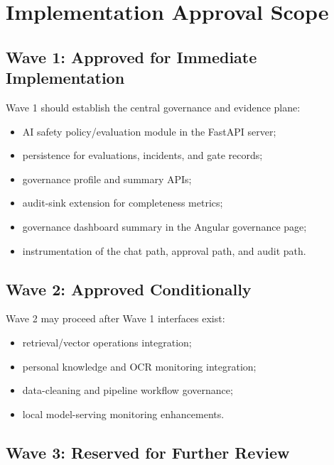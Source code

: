 \documentclass[11pt,a4paper]{article}
\begin{document}
\section{Implementation Approval Scope}

\subsection{Wave 1: Approved for Immediate Implementation}

Wave 1 should establish the central governance and evidence plane:

\begin{itemize}[nosep]
    \item AI safety policy/evaluation module in the FastAPI server;
    \item persistence for evaluations, incidents, and gate records;
    \item governance profile and summary APIs;
    \item audit-sink extension for completeness metrics;
    \item governance dashboard summary in the Angular governance page;
    \item instrumentation of the chat path, approval path, and audit path.
\end{itemize}

\subsection{Wave 2: Approved Conditionally}

Wave 2 may proceed after Wave 1 interfaces exist:

\begin{itemize}[nosep]
    \item retrieval/vector operations integration;
    \item personal knowledge and OCR monitoring integration;
    \item data-cleaning and pipeline workflow governance;
    \item local model-serving monitoring enhancements.
\end{itemize}

\subsection{Wave 3: Reserved for Further Review}
\end{document}
